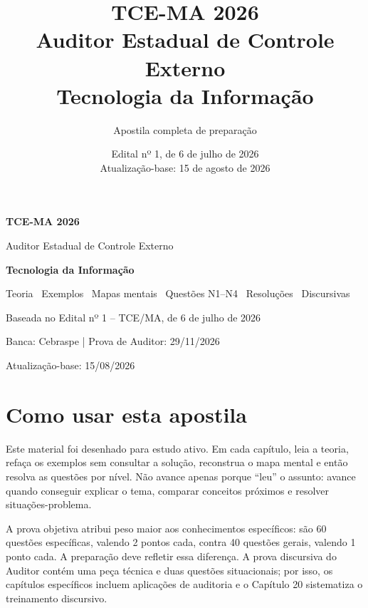 \documentclass[11pt,oneside,openany]{book}
\title{\textbf{TCE-MA 2026}\\[0.4em]\Large Auditor Estadual de Controle Externo\\[0.2em]\large Tecnologia da Informação}
\author{Apostila completa de preparação}
\date{Edital nº 1, de 6 de julho de 2026\\Atualização-base: 15 de agosto de 2026}
\begin{document}
\begin{titlepage}
\vspace*{3.0cm}
{\color{white}\Huge\bfseries TCE-MA 2026\par}
\vspace{0.5cm}
{\color{white}\LARGE Auditor Estadual de Controle Externo\par}
\vspace{0.25cm}
{\color{ambar}\LARGE\bfseries Tecnologia da Informação\par}
\vfill
{\color{white}\large Teoria \textbullet\ Exemplos \textbullet\ Mapas mentais \textbullet\ Questões N1--N4 \textbullet\ Resoluções \textbullet\ Discursivas\par}
\vspace{0.5cm}
{\color{white}\normalsize Baseada no Edital nº 1 -- TCE/MA, de 6 de julho de 2026\par}
{\color{white}\normalsize Banca: Cebraspe \quad | \quad Prova de Auditor: 29/11/2026\par}
{\color{white}\small Atualização-base: 15/08/2026\par}
\end{titlepage}

\frontmatter
\chapter*{Como usar esta apostila}
Este material foi desenhado para estudo ativo. Em cada capítulo, leia a teoria, refaça os exemplos sem consultar a solução, reconstrua o mapa mental e então resolva as questões por nível. Não avance apenas porque ``leu'' o assunto: avance quando conseguir explicar o tema, comparar conceitos próximos e resolver situações-problema.

A prova objetiva atribui peso maior aos conhecimentos específicos: são 60 questões específicas, valendo 2 pontos cada, contra 40 questões gerais, valendo 1 ponto cada. A preparação deve refletir essa diferença. A prova discursiva do Auditor contém uma peça técnica e duas questões situacionais; por isso, os capítulos específicos incluem aplicações de auditoria e o Capítulo 20 sistematiza o treinamento discursivo.
\end{document}
